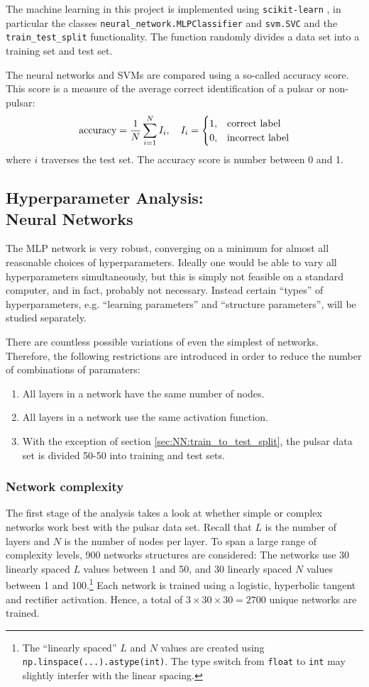 \documentclass[nofootinbib,reprint,english]{revtex4-1}
\begin{document}
The machine learning in this project is implemented using \texttt{scikit-learn} \cite{sklearn}, in particular the classes \texttt{neural\_network.MLPClassifier} and \texttt{svm.SVC} and the \texttt{train\_test\_split} functionality. The function randomly divides a data set into a training set and test set.

The neural networks and SVMs are compared using a so-called accuracy score. This score is a measure of the average correct identification of a pulsar or non-pulsar:
\begin{equation}
\text{accuracy}=\frac{1}{N}\sum_{i=1}^NI_i\qc I_i=\begin{cases}1,&\text{correct label}\\0,&\text{incorrect label}\end{cases}
\end{equation}
where \(i\) traverses the test set. The accuracy score is number between 0 and 1.

\subsection{Hyperparameter Analysis:\\Neural Networks}
The MLP network is very robust, converging on a minimum for almost all reasonable choices of hyperparameters. Ideally one would be able to vary all hyperparameters simultaneously, but this is simply not feasible on a standard computer, and in fact, probably not necessary. Instead certain ``types'' of hyperparameters, e.g. ``learning parameters'' and ``structure parameters'', will be studied separately.

There are countless possible variations of even the simplest of networks. Therefore, the following restrictions are introduced in order to reduce the number of combinations of paramaters:
\begin{enumerate}
\item All layers in a network have the same number of nodes.
\item All layers in a network use the same activation function.
\item With the exception of section \ref{sec:NN:train_to_test_split}, the pulsar data set is divided 50-50 into training and test sets.
\end{enumerate}
\subsubsection{Network complexity}
The first stage of the analysis takes a look at whether simple or complex networks work best with the pulsar data set. Recall that \(L\) is the number of layers and \(N\) is the number of nodes per layer. To span a large range of complexity levels, 900 networks structures are considered: The networks use 30 linearly spaced \(L\) values between 1 and 50, and 30 linearly spaced \(N\) values between 1 and 100.\footnote{The ``linearly spaced'' \(L\) and \(N\) values are created using \texttt{np.linspace(...).astype(int)}. The type switch from \texttt{float} to \texttt{int} may slightly interfer with the linear spacing.} Each network is trained using a logistic, hyperbolic tangent and rectifier activation. Hence, a total of \(3\times30\times30=2700\) unique networks are trained.
\end{document}

